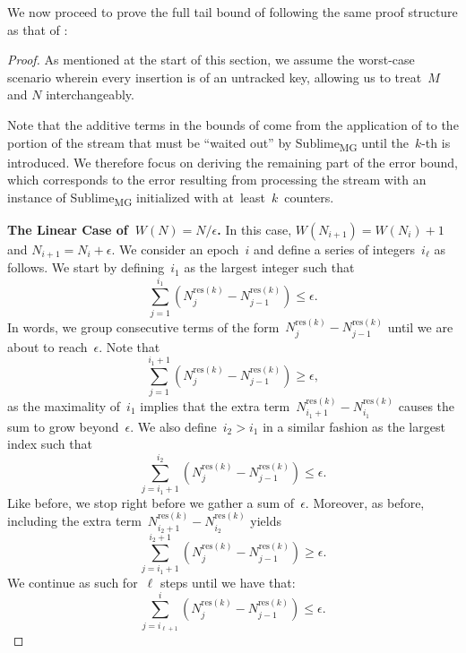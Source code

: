 \documentclass[sigconf]{acmart}
\newcommand{\sketch}{Sublime}
\newcommand{\sketchmg}{\sketch\textsubscript{MG}\xspace}
\newcommand{\parentheses}[1]{\left(#1\right)}
\begin{document}
We now proceed to prove the full tail bound of  following the
same proof structure as that of :
\thmmgres*
\begin{proof}
    As mentioned at the start of this section, we assume the worst-case scenario wherein every insertion is of an untracked key, allowing us to treat~$M$ and $N$ interchangeably.

    Note that the additive terms in the bounds of  come from the application of  to the portion of the stream that must be ``waited out'' by \sketchmg until the~$k${\nobreakdash-}th is introduced.
    We therefore focus on deriving the remaining part of the error bound, which corresponds to the error resulting from processing the stream with an instance of \sketchmg initialized with \mbox{at least~$k$ counters}.

    \textbf{The Linear Case of~$W(N)=N/\epsilon$.} 
    In this case, $W(N_{i+1})=W(N_i)+1$ and $N_{i+1}=N_i +
    \epsilon$. We consider an epoch~$i$ and define a series of
    integers~$i_\ell$ as follows. We start by defining~$i_1$ as the largest
    integer such that
    $$ \sum_{j=1}^{i_1} \parentheses{N^{\text{res}(k)}_j- N^{\text{res}(k)}_{j-1}} \leq \epsilon. $$
    In words, we group consecutive terms of the form~$N^{\text{res}(k)}_j-
    N^{\text{res}(k)}_{j-1}$ until we are about to reach~$\epsilon$. Note that
    $$ \sum_{j=1}^{i_1+1} \parentheses{N^{\text{res}(k)}_j- N^{\text{res}(k)}_{j-1}} \geq \epsilon, $$
    as the maximality of~$i_1$ implies that the extra
    term~$N^{\text{res}(k)}_{i_1+1}- N^{\text{res}(k)}_{i_1}$ causes the sum to
    grow beyond~$\epsilon$. We also define~$i_2 > i_1$ in a similar fashion as
    the largest index such that 
    $$ \sum_{j=i_1+1}^{i_2} \parentheses{N^{\text{res}(k)}_j - N^{\text{res}(k)}_{j-1}} \leq \epsilon. $$
    Like before, we stop right before we gather a sum of~$\epsilon$.
    Moreover, as before, including the extra
    term~$N_{i_2+1}^{\text{res}(k)}-N_{i_2}^{\text{res}(k)}$ yields
    $$ \sum_{j=i_{1}+1}^{i_2+1} \parentheses{N^{\text{res}(k)}_j- N^{\text{res}(k)}_{j-1}} \geq \epsilon. $$
    We continue as such for~$\ell$ steps until we have that:
    $$ \sum_{j=i_{\ell+1}}^{i} \parentheses{N^{\text{res}(k)}_j- N^{\text{res}(k)}_{j-1}} \leq \epsilon. $$


\end{proof}
\end{document}

